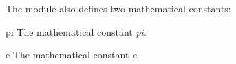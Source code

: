 The module also defines two mathematical constants:

\begin{datadesc}{pi}
The mathematical constant \emph{pi}.
\end{datadesc}

\begin{datadesc}{e}
The mathematical constant \emph{e}.
\end{datadesc}

\begin{seealso}
\end{seealso}
